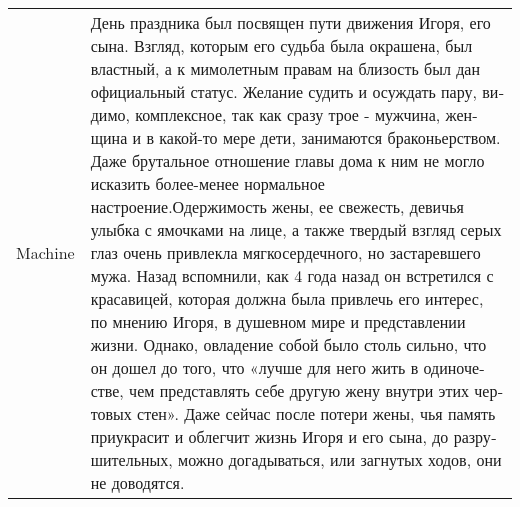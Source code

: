 \begin{center}
\begin{supertabular}{l | p{12cm}}
        \midrule
        Machine & \foreignlanguage{russian}{День праздника был посвящен пути движения Игоря, его сына. Взгляд, которым его судьба была окрашена, был властный, а к мимолетным правам на близость был дан официальный статус. Желание судить и осуждать пару, видимо, комплексное, так как сразу трое - мужчина, женщина и в какой-то мере дети, занимаются браконьерством. Даже брутальное отношение главы дома к ним не могло исказить более-менее нормальное настроение.Одержимость жены, ее свежесть, девичья улыбка с ямочками на лице, а также твердый взгляд серых глаз очень привлекла мягкосердечного, но застаревшего мужа. Назад вспомнили, как 4 года назад он встретился с красавицей, которая должна была привлечь его интерес, по мнению Игоря, в душевном мире и представлении жизни. Однако, овладение собой было столь сильно, что он дошел до того, что «лучше для него жить в одиночестве, чем представлять себе другую жену внутри этих чертовых стен». Даже сейчас после потери жены, чья память приукрасит и облегчит жизнь Игоря и его сына, до разрушительных, можно догадываться, или загнутых ходов, они не доводятся.}\\


\end{supertabular}
\end{center}
